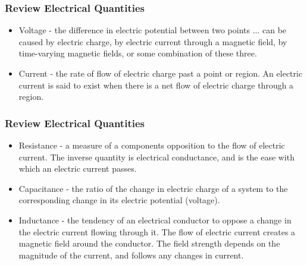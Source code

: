 \documentclass[fleqn]{beamer} %
\newcommand{\sectionIsubsectionItitle}{Review Electrical Quantities}
\begin{document}
			\begin{frame}
				\frametitle{\sectionIsubsectionItitle}

				\small
				\begin{itemize}

					
					\item {\PR Voltage} - the difference in electric potential between two points ... can be caused by electric charge, by electric current through a magnetic field, by time-varying magnetic fields, or some combination of these three.
					
					\item {\RD Current} - the rate of flow of electric charge past a point or region. An electric current is said to exist when there is a net flow of electric charge through a region.

				\end{itemize}
							

			\end{frame}

			\begin{frame}
				\frametitle{\sectionIsubsectionItitle}

						\bigskip
						\begin{itemize}


						\item {\BL Resistance} - a measure of a components opposition to the flow of electric current. The inverse quantity is electrical conductance, and is the ease with which an electric current passes.  
						
						
						\item {\PR Capacitance} - the ratio of the change in electric charge of a system to the corresponding change in its electric potential (voltage).
						
						\item {\RD Inductance} - the tendency of an electrical conductor to oppose a change in the electric current flowing through it. The flow of electric current creates a magnetic field around the conductor. The field strength depends on the magnitude of the current, and follows any changes in current.

					\end{itemize}
							
	
		

			\end{frame}
\end{document}
